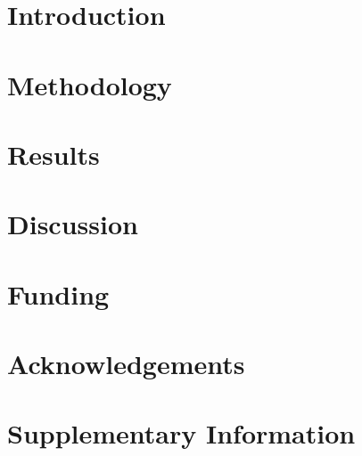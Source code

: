 \documentclass{article}
\begin{document}

\section{Introduction}\label{intro}


\section{Methodology}\label{method}


\section{Results}\label{results}


\section{Discussion}\label{discuss}


\section*{Funding}


\section*{Acknowledgements}





\newpage
\section*{Supplementary Information}
\beginsupplement

\newpage
{}
\end{document}
